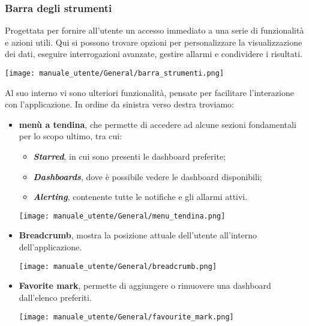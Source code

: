 \subsubsection{Barra degli strumenti}
Progettata per fornire all'utente un accesso immediato a una serie di funzionalità e azioni utili. Qui si possono trovare opzioni per personalizzare la visualizzazione dei dati, eseguire interrogazioni avanzate, gestire allarmi e condividere i risultati.
\begin{center}
    \texttt{[image: manuale\_utente/General/barra\_strumenti.png]}
\end{center}
Al suo interno vi sono ulteriori funzionalità, pensate per facilitare l'interazione con l'applicazione. In ordine da sinistra verso destra troviamo:
\begin{itemize}
    \item \textbf{menù a tendina}, che permette di accedere ad alcune sezioni fondamentali per lo scopo ultimo, tra cui:
        \begin{itemize}
            \item \textbf{\textit{Starred}}, in cui sono presenti le dashboard preferite;
            \item \textbf{\textit{Dashboards}}, dove è possibile vedere le dashboard disponibili;
            \item \textbf{\textit{Alerting}}, contenente tutte le notifiche e gli allarmi attivi.
        \end{itemize}
        \begin{center}
            \texttt{[image: manuale\_utente/General/menu\_tendina.png]}
        \end{center}
    \item \textbf{Breadcrumb}, mostra la posizione attuale dell'utente all'interno dell'applicazione.
        \begin{center}
            \texttt{[image: manuale\_utente/General/breadcrumb.png]}
        \end{center}
    \item \textbf{Favorite mark}, permette di aggiungere o rimuovere una dashboard dall'elenco preferiti.
        \begin{center}
            \texttt{[image: manuale\_utente/General/favourite\_mark.png]}
        \end{center}

\end{itemize}
